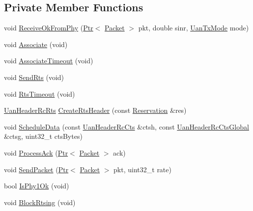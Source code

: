 \subsection*{Private Member Functions}
\begin{DoxyCompactItemize}
\item 
void \hyperlink{classns3_1_1UanMacRc_a04c4b6db8819b20151c8009553dbcd16}{Receive\+Ok\+From\+Phy} (\hyperlink{classns3_1_1Ptr}{Ptr}$<$ \hyperlink{classns3_1_1Packet}{Packet} $>$ pkt, double sinr, \hyperlink{classns3_1_1UanTxMode}{Uan\+Tx\+Mode} mode)
\item 
void \hyperlink{classns3_1_1UanMacRc_ad0c89fbba2f362b7915cd33809cbad14}{Associate} (void)
\item 
void \hyperlink{classns3_1_1UanMacRc_af23682ff6db736c6a2c9eceae8252cd2}{Associate\+Timeout} (void)
\item 
void \hyperlink{classns3_1_1UanMacRc_a5bef59fd83813d602f41fad1b4345ff1}{Send\+Rts} (void)
\item 
void \hyperlink{classns3_1_1UanMacRc_af4520e133c4a7e82f718fc42eac63459}{Rts\+Timeout} (void)
\item 
\hyperlink{classns3_1_1UanHeaderRcRts}{Uan\+Header\+Rc\+Rts} \hyperlink{classns3_1_1UanMacRc_a1b6f4d2512fa857129661591d436139d}{Create\+Rts\+Header} (const \hyperlink{classns3_1_1Reservation}{Reservation} \&res)
\item 
void \hyperlink{classns3_1_1UanMacRc_a050570db8ee60717b778e06a9b8b9e77}{Schedule\+Data} (const \hyperlink{classns3_1_1UanHeaderRcCts}{Uan\+Header\+Rc\+Cts} \&ctsh, const \hyperlink{classns3_1_1UanHeaderRcCtsGlobal}{Uan\+Header\+Rc\+Cts\+Global} \&ctsg, uint32\+\_\+t cts\+Bytes)
\item 
void \hyperlink{classns3_1_1UanMacRc_a9c52fc366178533ec87fa9677c6c7f97}{Process\+Ack} (\hyperlink{classns3_1_1Ptr}{Ptr}$<$ \hyperlink{classns3_1_1Packet}{Packet} $>$ ack)
\item 
void \hyperlink{classns3_1_1UanMacRc_a02a98cafc7e0c37962929792b96f1c31}{Send\+Packet} (\hyperlink{classns3_1_1Ptr}{Ptr}$<$ \hyperlink{classns3_1_1Packet}{Packet} $>$ pkt, uint32\+\_\+t rate)
\item 
bool \hyperlink{classns3_1_1UanMacRc_ac0f5a6a4339db6f52fd1d850f8e49ded}{Is\+Phy1\+Ok} (void)
\item 
void \hyperlink{classns3_1_1UanMacRc_ac1998fa405ee716969994d5b49bc5fe6}{Block\+Rtsing} (void)
\end{DoxyCompactItemize}
